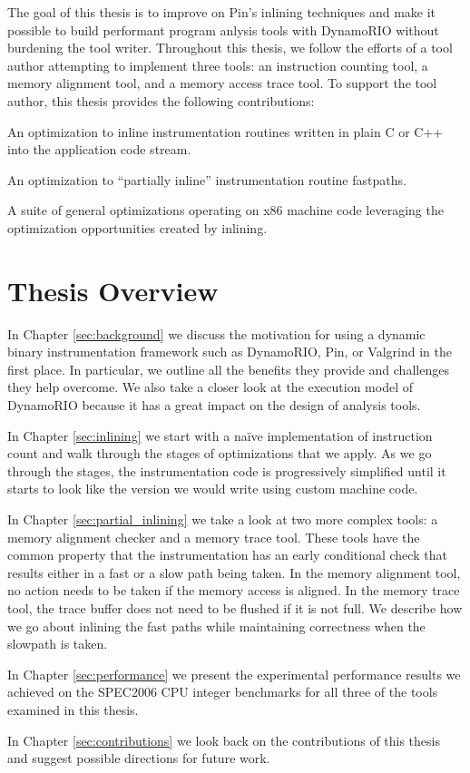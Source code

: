 The goal of this thesis is to improve on Pin's inlining techniques and make it
possible to build performant program anlysis tools with DynamoRIO without
burdening the tool writer.  Throughout this thesis, we follow the efforts of a
tool author attempting to implement three tools: an instruction counting tool, a
memory alignment tool, and a memory access trace tool.  To support the tool
author, this thesis provides the following contributions:

\begin{packed_enumerate}
\item An optimization to inline instrumentation routines written in plain C or
C++ into the application code stream.
\item An optimization to ``partially inline'' instrumentation routine fastpaths.
\item A suite of general optimizations operating on x86 machine code leveraging
the optimization opportunities created by inlining.
\end{packed_enumerate}

\section{Thesis Overview}

In Chapter \ref{sec:background} we discuss the motivation for using a dynamic
binary instrumentation framework such as DynamoRIO, Pin, or Valgrind in the
first place.  In particular, we outline all the benefits they provide and
challenges they help overcome.  We also take a closer look at the execution
model of DynamoRIO because it has a great impact on the design of analysis
tools.

In Chapter \ref{sec:inlining} we start with a na\"ive implementation of
instruction count and walk through the stages of optimizations that we apply.
As we go through the stages, the instrumentation code is progressively
simplified until it starts to look like the version we would write using custom
machine code.

In Chapter \ref{sec:partial_inlining} we take a look at two more complex tools:
a memory alignment checker and a memory trace tool.  These tools have the common
property that the instrumentation has an early conditional check that results
either in a fast or a slow path being taken.  In the memory alignment tool, no
action needs to be taken if the memory access is aligned.  In the memory trace
tool, the trace buffer does not need to be flushed if it is not full.  We
describe how we go about inlining the fast paths while maintaining correctness
when the slowpath is taken.

In Chapter \ref{sec:performance} we present the experimental performance results
we achieved on the SPEC2006 CPU integer benchmarks\cite{spec_cpu_2k6} for all
three of the tools examined in this thesis.

In Chapter \ref{sec:contributions} we look back on the contributions of this
thesis and suggest possible directions for future work.

